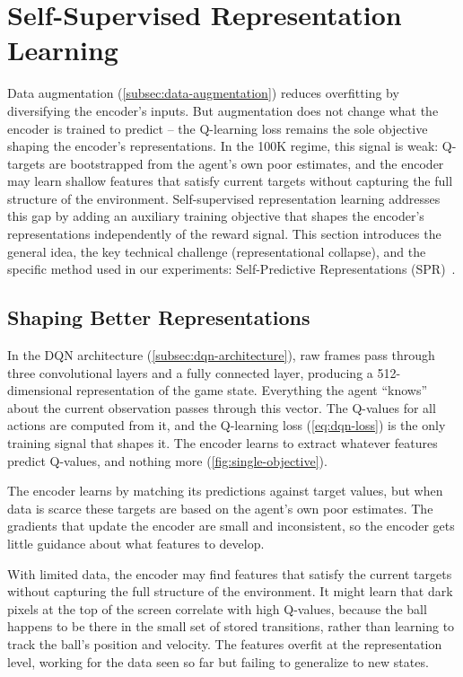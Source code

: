\section{Self-Supervised Representation Learning}
\label{sec:ssl}

Data augmentation (\cref{subsec:data-augmentation}) reduces
overfitting by diversifying the encoder's inputs. But augmentation
does not change what the encoder is trained to predict -- the
Q-learning loss remains the sole objective shaping the encoder's
representations. In the 100K regime, this signal is weak: Q-targets
are bootstrapped from the agent's own poor estimates, and the
encoder may learn shallow features that satisfy current targets
without capturing the full structure of the environment.
Self-supervised representation learning addresses this gap by adding
an auxiliary training objective that shapes the encoder's
representations independently of the reward signal. This section
introduces the general idea, the key technical challenge
(representational collapse), and the specific method used in our
experiments: Self-Predictive Representations
(SPR)~\citep{schwarzer2021dataefficient}.

\subsection{Shaping Better Representations}
\label{subsec:shaping-better-representations}

In the DQN architecture (\cref{subsec:dqn-architecture}), raw frames
pass through three convolutional layers and a fully connected layer,
producing a 512-dimensional representation of the game state.
Everything the agent ``knows'' about the current observation passes
through this vector. The Q-values for all actions are computed from
it, and the Q-learning loss (\cref{eq:dqn-loss}) is the only training
signal that shapes it. The encoder learns to extract whatever features
predict Q-values, and nothing more (\cref{fig:single-objective}).



\smallskip
The encoder learns by matching its predictions against target values,
but when data is scarce these targets are based on the agent's own
poor estimates. The gradients that update the encoder are small and
inconsistent, so the encoder gets little guidance about what features
to develop.

\smallskip
With limited data, the encoder may find features that satisfy the
current targets without capturing the full structure of the
environment. It might learn that dark pixels at the top of the screen
correlate with high Q-values, because the ball happens to be there in
the small set of stored transitions, rather than learning to track the
ball's position and velocity. The features overfit at the
representation level, working for the data seen so far but failing to
generalize to new states.

